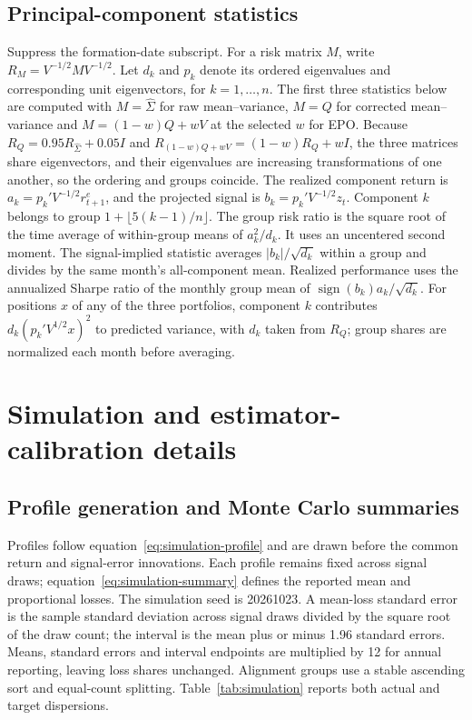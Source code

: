 \subsection{Principal-component statistics}
Suppress the formation-date subscript. For a risk matrix $M$, write $R_M=V^{-1/2}MV^{-1/2}$. Let $d_k$ and $p_k$ denote its ordered eigenvalues and corresponding unit eigenvectors, for $k=1,\ldots,n$. The first three statistics below are computed with $M=\widehat\Sigma$ for raw mean--variance, $M=Q$ for corrected mean--variance and $M=(1-w)Q+wV$ at the selected $w$ for EPO. Because $R_Q=0.95R_{\widehat\Sigma}+0.05I$ and $R_{(1-w)Q+wV}=(1-w)R_Q+wI$, the three matrices share eigenvectors, and their eigenvalues are increasing transformations of one another, so the ordering and groups coincide. The realized component return is $a_k=p_k'V^{-1/2}r^e_{t+1}$, and the projected signal is $b_k=p_k'V^{-1/2}z_t$. Component $k$ belongs to group $1+\lfloor5(k-1)/n\rfloor$. The group risk ratio is the square root of the time average of within-group means of $a_k^2/d_k$. It uses an uncentered second moment. The signal-implied statistic averages $|b_k|/\sqrt{d_k}$ within a group and divides by the same month's all-component mean. Realized performance uses the annualized Sharpe ratio of the monthly group mean of $\operatorname{sign}(b_k)a_k/\sqrt{d_k}$. For positions $x$ of any of the three portfolios, component $k$ contributes $d_k(p_k'V^{1/2}x)^2$ to predicted variance, with $d_k$ taken from $R_Q$; group shares are normalized each month before averaging.

\section{Simulation and estimator-calibration details}
\label{app:simulation}
\setcounter{table}{0}\setcounter{figure}{0}
\subsection{Profile generation and Monte Carlo summaries}
Profiles follow equation~\eqref{eq:simulation-profile} and are drawn before the common return and signal-error innovations. Each profile remains fixed across signal draws; equation~\eqref{eq:simulation-summary} defines the reported mean and proportional losses. The simulation seed is 20261023. A mean-loss standard error is the sample standard deviation across signal draws divided by the square root of the draw count; the interval is the mean plus or minus 1.96 standard errors. Means, standard errors and interval endpoints are multiplied by 12 for annual reporting, leaving loss shares unchanged. Alignment groups use a stable ascending sort and equal-count splitting. Table~\ref{tab:simulation} reports both actual and target dispersions.


